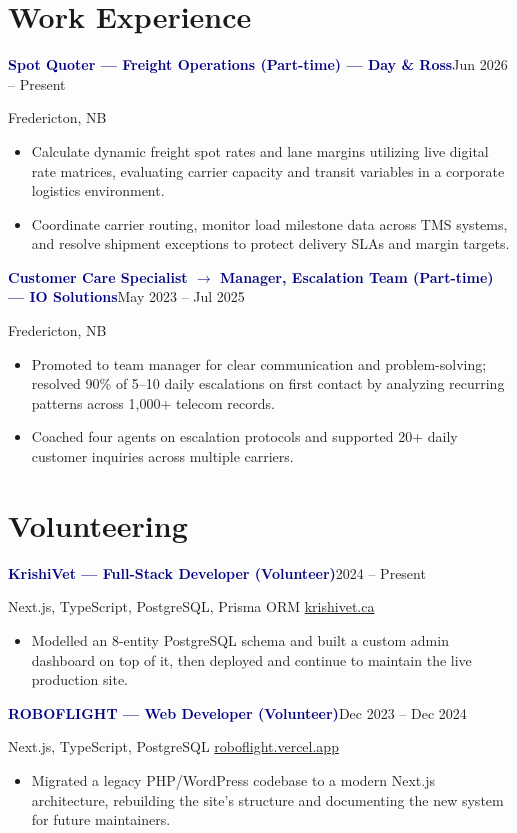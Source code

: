 \documentclass[11.5pt, letterpaper]{article}
\newcommand{\entry}[2]{\vspace{6pt}\noindent\textcolor{navy}{\bfseries #1}\hfill\textcolor{meta}{#2}\par}
\newcommand{\sub}[1]{\noindent\textcolor{meta}{#1}\par\vspace{4pt}}
\begin{document}
\section{Work Experience}
\entry{Spot Quoter --- Freight Operations (Part-time) --- Day \& Ross}{Jun 2026 -- Present}
\sub{Fredericton, NB}
\begin{itemize}
  \item Calculate dynamic freight spot rates and lane margins utilizing live digital rate matrices, evaluating carrier capacity and transit variables in a corporate logistics environment.
  \item Coordinate carrier routing, monitor load milestone data across TMS systems, and resolve shipment exceptions to protect delivery SLAs and margin targets.
\end{itemize}
\entry{Customer Care Specialist \(\rightarrow\) Manager, Escalation Team (Part-time) --- IO Solutions}{May 2023 -- Jul 2025}
\sub{Fredericton, NB}
\begin{itemize}
  \item Promoted to team manager for clear communication and problem-solving; resolved 90\% of 5--10 daily escalations on first contact by analyzing recurring patterns across 1,000+ telecom records.
  \item Coached four agents on escalation protocols and supported 20+ daily customer inquiries across multiple carriers.
\end{itemize}

\section{Volunteering}
\entry{KrishiVet --- Full-Stack Developer (Volunteer)}{2024 -- Present}
\sub{Next.js, TypeScript, PostgreSQL, Prisma ORM \enspace\textcolor{meta}{\textbullet}\enspace \href{https://krishivet.ca}{krishivet.ca}}
\begin{itemize}
  \item Modelled an 8-entity PostgreSQL schema and built a custom admin dashboard on top of it, then deployed and continue to maintain the live production site.
\end{itemize}
\entry{ROBOFLIGHT --- Web Developer (Volunteer)}{Dec 2023 -- Dec 2024}
\sub{Next.js, TypeScript, PostgreSQL \enspace\textcolor{meta}{\textbullet}\enspace \href{https://roboflight.vercel.app/}{roboflight.vercel.app}}
\begin{itemize}
  \item Migrated a legacy PHP/WordPress codebase to a modern Next.js architecture, rebuilding the site's structure and documenting the new system for future maintainers.
\end{itemize}
\end{document}
